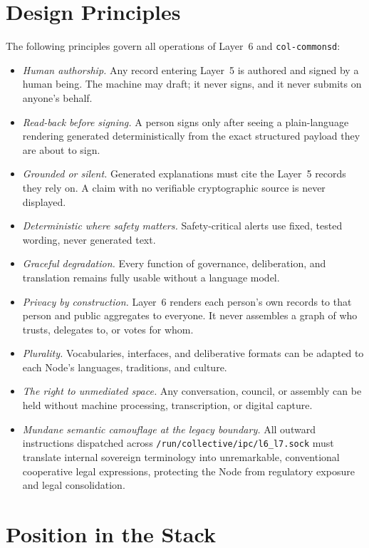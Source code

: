 \section{Design Principles}

The following principles govern all operations of Layer~6 and \texttt{col-commonsd}:
\begin{itemize}
  \item \textit{Human authorship.} Any record entering Layer~5 is authored and signed by a human being. The machine may draft; it never signs, and it never submits on anyone's behalf.
  \item \textit{Read-back before signing.} A person signs only after seeing a plain-language rendering generated deterministically from the exact structured payload they are about to sign.
  \item \textit{Grounded or silent.} Generated explanations must cite the Layer~5 records they rely on. A claim with no verifiable cryptographic source is never displayed.
  \item \textit{Deterministic where safety matters.} Safety-critical alerts use fixed, tested wording, never generated text.
  \item \textit{Graceful degradation.} Every function of governance, deliberation, and translation remains fully usable without a language model.
  \item \textit{Privacy by construction.} Layer~6 renders each person's own records to that person and public aggregates to everyone. It never assembles a graph of who trusts, delegates to, or votes for whom.
  \item \textit{Plurality.} Vocabularies, interfaces, and deliberative formats can be adapted to each Node's languages, traditions, and culture.
  \item \textit{The right to unmediated space.} Any conversation, council, or assembly can be held without machine processing, transcription, or digital capture.
  \item \textit{Mundane semantic camouflage at the legacy boundary.} All outward instructions dispatched across \texttt{/run/collective/ipc/l6\_l7.sock} must translate internal sovereign terminology into unremarkable, conventional cooperative legal expressions, protecting the Node from regulatory exposure and legal consolidation.
\end{itemize}

\section{Position in the Stack}

